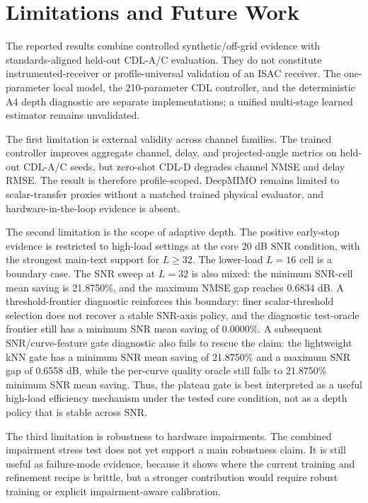 \section{Limitations and Future Work}

The reported results combine controlled synthetic/off-grid evidence with standards-aligned held-out CDL-A/C evaluation. They do not constitute instrumented-receiver or profile-universal validation of an ISAC receiver. The one-parameter local model, the 210-parameter CDL controller, and the deterministic A4 depth diagnostic are separate implementations; a unified multi-stage learned estimator remains unvalidated.

The first limitation is external validity across channel families. The trained controller improves aggregate channel, delay, and projected-angle metrics on held-out CDL-A/C seeds, but zero-shot CDL-D degrades channel NMSE and delay RMSE. The result is therefore profile-scoped. DeepMIMO remains limited to scalar-transfer proxies without a matched trained physical evaluator, and hardware-in-the-loop evidence is absent.

The second limitation is the scope of adaptive depth. The positive early-stop evidence is restricted to high-load settings at the core 20 dB SNR condition, with the strongest main-text support for $L\geq32$. The lower-load $L=16$ cell is a boundary case. The SNR sweep at $L=32$ is also mixed: the minimum SNR-cell mean saving is 21.8750\%, and the maximum NMSE gap reaches 0.6834 dB. A threshold-frontier diagnostic reinforces this boundary: finer scalar-threshold selection does not recover a stable SNR-axis policy, and the diagnostic test-oracle frontier still has a minimum SNR mean saving of 0.0000\%. A subsequent SNR/curve-feature gate diagnostic also fails to rescue the claim: the lightweight kNN gate has a minimum SNR mean saving of 21.8750\% and a maximum SNR gap of 0.6558 dB, while the per-curve quality oracle still falls to 21.8750\% minimum SNR mean saving. Thus, the plateau gate is best interpreted as a useful high-load efficiency mechanism under the tested core condition, not as a depth policy that is stable across SNR.

The third limitation is robustness to hardware impairments. The combined impairment stress test does not yet support a main robustness claim. It is still useful as failure-mode evidence, because it shows where the current training and refinement recipe is brittle, but a stronger contribution would require robust training or explicit impairment-aware calibration.

